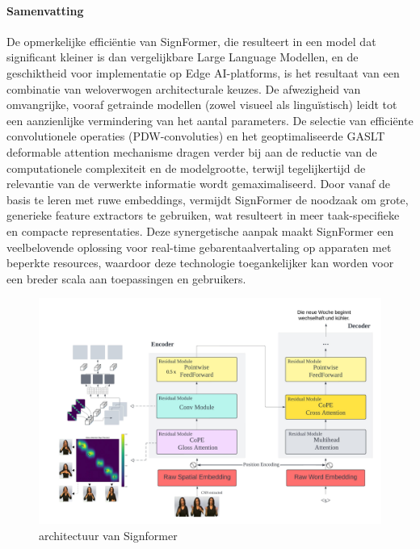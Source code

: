 \paragraph{Samenvatting}
De opmerkelijke efficiëntie van SignFormer, die resulteert in een model dat significant kleiner is dan vergelijkbare Large Language Modellen, en de geschiktheid voor implementatie op Edge AI-platforms, is het resultaat van een combinatie van weloverwogen architecturale keuzes. 
De afwezigheid van omvangrijke, vooraf getrainde modellen (zowel visueel als linguïstisch) leidt tot een aanzienlijke vermindering van het aantal parameters. De selectie van efficiënte convolutionele operaties (PDW-convoluties) en het geoptimaliseerde GASLT deformable attention mechanisme dragen verder bij aan de reductie van de computationele complexiteit en de modelgrootte, terwijl tegelijkertijd de relevantie van de verwerkte informatie wordt gemaximaliseerd. 
Door vanaf de basis te leren met ruwe embeddings, vermijdt SignFormer de noodzaak om grote, generieke feature extractors te gebruiken, wat resulteert in meer taak-specifieke en compacte representaties. 
Deze synergetische aanpak maakt SignFormer een veelbelovende oplossing voor real-time gebarentaalvertaling op apparaten met beperkte resources, waardoor deze technologie toegankelijker kan worden voor een breder scala aan toepassingen en gebruikers.

\begin{figure}[h!]
  \includegraphics[width=1\textwidth]{../graphics/structuurSignFormer.png}
  \caption{architectuur van Signformer \autocite{eta2024signformer}}  
  \label{fig:signformer}
\end{figure}


